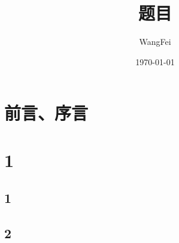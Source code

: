 \documentclass{ctexbook}
\title{题目}
\author{WangFei}
\date{\today}
\begin{document}
\maketitle
\tableofcontents

\frontmatter
\chapter{前言、序言}

\mainmatter
\chapter{1}
\section{1}
\section{2}
\end{document}
